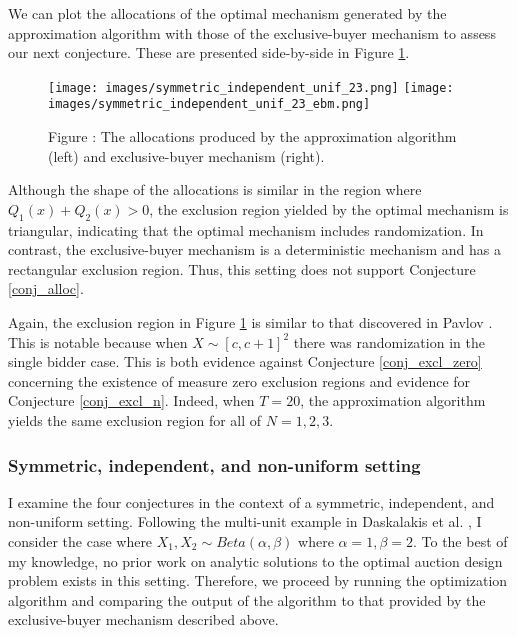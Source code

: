 We can plot the allocations of the optimal mechanism generated by the approximation algorithm with those of the exclusive-buyer mechanism to assess our next conjecture. These are presented side-by-side in Figure \ref{fig:pavlov_n2_23_alloc}.

\begin{figure}[H]
    \begin{center}
    \texttt{[image: images/symmetric\_independent\_unif\_23.png]}
    \texttt{[image: images/symmetric\_independent\_unif\_23\_ebm.png]}
    \end{center}
    
    \vspace{1mm}
    \raggedright{\small {\sc Figure \thefig\label{fig:pavlov_n2_23_alloc}:} The allocations produced by the approximation algorithm (left) and exclusive-buyer mechanism (right).} 
\end{figure}

\noindent Although the shape of the allocations is similar in the region where $Q_1(x) + Q_2(x) > 0$, the exclusion region yielded by the optimal mechanism is triangular, indicating that the optimal mechanism includes randomization. In contrast, the exclusive-buyer mechanism is a deterministic mechanism and has a rectangular exclusion region. Thus, this setting does not support Conjecture \ref{conj_alloc}.

Again, the exclusion region in Figure \ref{fig:pavlov_n2_23_alloc} is similar to that discovered in Pavlov \autocite*{pavlov2011optimal}. This is notable because when $X \sim [c,c+1]^2$ there was randomization in the single bidder case. This is both evidence against Conjecture \ref{conj_excl_zero} concerning the existence of measure zero exclusion regions and evidence for Conjecture \ref{conj_excl_n}. Indeed, when $T=20$, the approximation algorithm yields the same exclusion region for all of $N=1,2,3$.





\subsubsection{Symmetric, independent, and non-uniform setting}

I examine the four conjectures in the context of a symmetric, independent, and non-uniform setting. Following the multi-unit example in Daskalakis et al. \autocite*{daskalakis2017strong}, I consider the case where $X_1,X_2 \sim Beta(\alpha,\beta)$ where $\alpha=1,\beta=2$. To the best of my knowledge, no prior work on analytic solutions to the optimal auction design problem exists in this setting. Therefore, we proceed by running the optimization algorithm and comparing the output of the algorithm to that provided by the exclusive-buyer mechanism described above.

